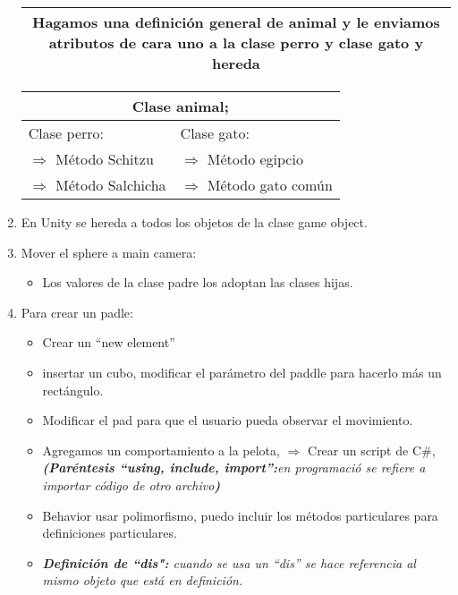 \begin{enumerate}
\begin{center}
\begin{tabular}{ | p{5cm} | p{5cm} | }
        \hline
        \multicolumn{2}{|c|}{Hagamos una definición general de animal y le enviamos atributos de cara uno a la clase perro y clase gato y hereda} \\
         \hline
        \end{tabular}
        \end{center}
        \begin{center}
        \begin{tabular}{ | p{5cm} | p{5cm} |  }
         \hline
         \multicolumn{2}{|c|}{Clase animal;} \\
         \hline
         Clase perro: & Clase gato: \\ 
         \hline
         $\Rightarrow$ Método Schitzu & $\Rightarrow$  Método egipcio \\
         \hline
         $\Rightarrow$ Método Salchicha & $\Rightarrow$ Método gato común \\  
         \hline
        \end{tabular}
        \end{center}
        
        
        \item En Unity se hereda a todos los objetos de la clase game object.
        \item Mover el sphere a main camera:
            \begin{itemize}
                \item Los valores de la clase padre los adoptan las clases hijas.
            \end{itemize}
        \item Para crear un padle:
            \begin{itemize}
                \item Crear un ``new element''
                \item insertar un cubo, modificar el parámetro del paddle para hacerlo más un rectángulo.
                \item Modificar el pad para que el usuario pueda observar el movimiento.
                \item Agregamos un comportamiento a la pelota, $\Rightarrow$ Crear un script de C\#, \emph{\textbf{(Paréntesis ``using, include, import'':}en programació se refiere a importar código de otro archivo\textbf{)}}
                \item Behavior usar polimorfismo, puedo incluir los métodos particulares para definiciones particulares.
                \item \emph{\textbf{Definición de ``dis":} cuando se usa un ``dis'' se hace referencia al mismo objeto que está en definición.}
            \end{itemize}
        
\end{enumerate}
